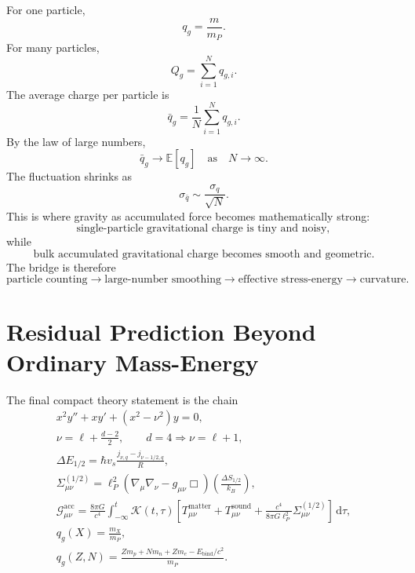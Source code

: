 \documentclass[11pt,a4paper]{article}
\renewcommand{\boxed}[1]{#1}
\newcommand{\dd}{\,\mathrm{d}}
\newcommand{\Tmat}{T_{\mu\nu}^{\mathrm{matter}}}
\newcommand{\Tsound}{T_{\mu\nu}^{\mathrm{sound}}}
\newcommand{\Sigmahalf}{\Sigma_{\mu\nu}^{(1/2)}}
\begin{document}
For one particle,
\begin{equation}
 q_g=\frac{m}{m_P}.
\label{eq:q-single}
\end{equation}
For many particles,
\begin{equation}
\boxed{Q_g=\sum_{i=1}^{N}q_{g,i}.}
\label{eq:q-total}
\end{equation}
The average charge per particle is
\begin{equation}
 \bar q_g=\frac{1}{N}\sum_{i=1}^{N}q_{g,i}.
\label{eq:q-average}
\end{equation}
By the law of large numbers,
\begin{equation}
\boxed{\bar q_g\rightarrow\mathbb{E}[q_g]\quad\text{as}\quad N\rightarrow\infty.}
\label{eq:lln}
\end{equation}
The fluctuation shrinks as
\begin{equation}
\boxed{\sigma_{\bar q}\sim\frac{\sigma_q}{\sqrt{N}}.}
\label{eq:sigma-shrink}
\end{equation}
This is where gravity as accumulated force becomes mathematically strong:
\begin{equation}
\boxed{\text{single-particle gravitational charge is tiny and noisy},}
\label{eq:single-noisy}
\end{equation}
while
\begin{equation}
\boxed{\text{bulk accumulated gravitational charge becomes smooth and geometric}.}
\label{eq:bulk-smooth}
\end{equation}
The bridge is therefore
\begin{equation}
\boxed{
\text{particle counting}
\rightarrow
\text{large-number smoothing}
\rightarrow
\text{effective stress-energy}
\rightarrow
\text{curvature}.
}
\label{eq:counting-to-curvature}
\end{equation}

\section{Residual Prediction Beyond Ordinary Mass-Energy}

The final compact theory statement is the chain
\begin{align}
\boxed{x^2y''+xy'+(x^2-\nu^2)y=0,}\label{eq:compact-bessel}\\
\boxed{\nu=\ell+\frac{d-2}{2},\qquad d=4\Rightarrow\nu=\ell+1,}\label{eq:compact-order}\\
\boxed{\Delta E_{1/2}=\hbar v_s\frac{j_{\nu,q}-j_{\nu-1/2,q}}{R},}\label{eq:compact-energy}\\
\boxed{\Sigmahalf=\ell_P^2(\nabla_\mu\nabla_\nu-g_{\mu\nu}\Box)\left(\frac{\Delta S_{1/2}}{k_B}\right),}\label{eq:compact-sigma}\\
\boxed{\mathcal{G}_{\mu\nu}^{\mathrm{acc}}=\frac{8\pi G}{c^4}\int_{-\infty}^{t}\mathcal{K}(t,\tau)\left[\Tmat+\Tsound+\frac{c^4}{8\pi G\ell_P^2}\Sigmahalf\right]\dd\tau,}\label{eq:compact-gacc}\\
\boxed{q_g(X)=\frac{m_X}{m_P},}\label{eq:compact-qg}\\
\boxed{q_g(Z,N)=\frac{Zm_p+Nm_n+Zm_e-E_{\mathrm{bind}}/c^2}{m_P}.}\label{eq:compact-isotope}
\end{align}
\end{document}

